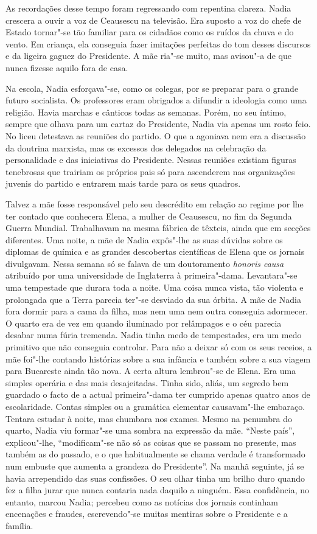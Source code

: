 As recordações desse tempo foram regressando com
repentina clareza. Nadia crescera a ouvir a voz de Ceausescu na
televisão. Era suposto a voz do chefe de Estado tornar"-se tão familiar
para os cidadãos como os ruídos da chuva e do vento. Em criança, ela
conseguia fazer imitações perfeitas do tom desses discursos e da
ligeira gaguez
do Presidente. A mãe ria"-se muito, mas avisou"-a de que nunca fizesse
aquilo fora de casa.

Na escola, Nadia esforçava"-se, como os colegas, por se preparar para o
grande futuro socialista. Os professores eram obrigados a difundir a
ideologia como uma religião. Havia marchas e cânticos todas as semanas.
Porém, no seu íntimo, sempre que olhava para um cartaz do Presidente,
Nadia via apenas um rosto feio. No liceu detestava as reuniões do
partido. O que a agoniava nem era a discussão da doutrina marxista, mas
os excessos dos delegados na celebração da personalidade e das
iniciativas do Presidente. Nessas reuniões existiam figuras tenebrosas
que trairiam os próprios pais só para ascenderem nas organizações
juvenis do partido e entrarem mais tarde para os seus quadros.

Talvez a mãe fosse responsável pelo seu descrédito em relação ao regime
por lhe ter contado que conhecera Elena, a mulher de Ceausescu, no fim
da Segunda Guerra Mundial. Trabalhavam na mesma fábrica de têxteis,
ainda que em secções diferentes. Uma noite, a mãe de Nadia expôs"-lhe as
suas dúvidas sobre os diplomas de química e as grandes descobertas
científicas de Elena que os jornais divulgavam. Nessa semana só se
falava de um doutoramento \emph{honoris causa} atribuído por uma universidade de Inglaterra à
primeira"-dama. Levantara"-se uma tempestade que durara toda a noite. Uma
coisa nunca vista, tão violenta e prolongada que a Terra parecia
ter"-se desviado da sua órbita. A mãe de Nadia fora dormir para a cama da
filha, mas nem uma nem outra conseguia adormecer. O quarto era de vez em
quando iluminado por relâmpagos e o céu parecia desabar numa fúria
tremenda. Nadia tinha medo de tempestades, era um medo primitivo que não conseguia controlar. Para não a
deixar só com os seus receios, a mãe foi"-lhe contando histórias sobre a
sua infância e também sobre a sua viagem para Bucareste ainda tão nova.
A certa altura lembrou"-se de Elena. Era uma simples operária e das mais
desajeitadas. Tinha sido, aliás, um segredo bem guardado o facto de a
actual primeira"-dama ter cumprido apenas quatro anos de escolaridade.
Contas simples ou a gramática elementar causavam"-lhe embaraço. Tentara
estudar à noite, mas chumbara nos exames. Mesmo na penumbra do quarto,
Nadia viu formar"-se uma sombra na expressão da mãe.
``Neste país'', explicou"-lhe, ``modificam"-se não só as coisas que se passam
no presente, mas também as do passado, e o que habitualmente se chama
verdade é transformado num embuste que aumenta a grandeza do
Presidente''. Na manhã seguinte, já se havia arrependido das suas
confissões. O seu olhar tinha um brilho duro quando fez a filha jurar
que nunca contaria nada daquilo a ninguém. Essa confidência, no entanto,
marcou Nadia; percebeu como as notícias dos jornais continham encenações
e fraudes, escrevendo"-se muitas mentiras sobre o Presidente e a
família.

